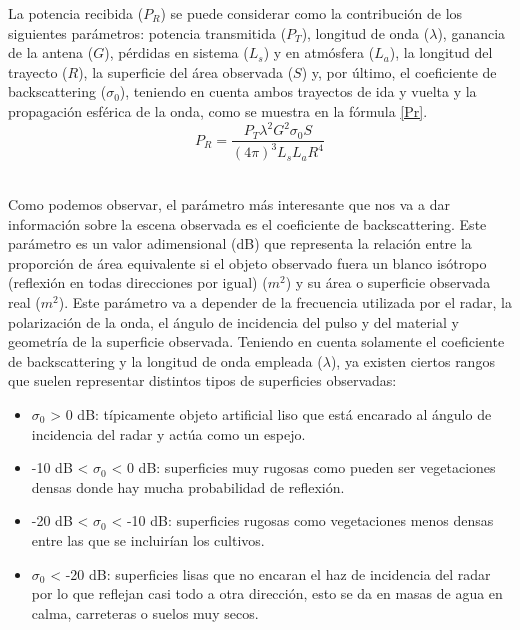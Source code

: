 \par La potencia recibida ($P_{R}$) se puede considerar como la contribución de los siguientes parámetros: potencia transmitida ($P_{T}$), longitud de onda ($\lambda$), ganancia de la antena ($G$), pérdidas en sistema ($L_{s}$) y en atmósfera ($L_{a}$), la longitud del trayecto ($R$), la superficie del área observada ($S$) y, por último, el coeficiente de backscattering ($\sigma_{0}$), teniendo en cuenta ambos trayectos de ida y vuelta y la propagación esférica de la onda, como se muestra en la fórmula \ref{Pr}. 
\\
\begin{equation} \label{Pr}
P_{R}=\frac{P_{T}\lambda ^{2}G^{2}\sigma_{0}S}{(4\pi ) ^{3}L_{s}L_{a}R^{4}}
\end{equation}
\\
\par Como podemos observar, el parámetro más interesante que nos va a dar información sobre la escena observada es el coeficiente de backscattering. Este parámetro es un valor adimensional (dB) que representa la relación entre la proporción de área equivalente si el objeto observado fuera un blanco isótropo (reflexión en todas direcciones por igual) ($m^{2}$) y su área o superficie observada real ($m^{2}$). Este parámetro va a depender de la frecuencia utilizada por el radar, la polarización de la onda, el ángulo de incidencia del pulso y del material y geometría de la superficie observada. Teniendo en cuenta solamente el coeficiente de backscattering y la longitud de onda empleada ($\lambda$), ya existen ciertos rangos que suelen representar distintos tipos de superficies observadas:
\begin{itemize}
	\item $\sigma_{0}$ > 0 dB: típicamente objeto artificial liso que está encarado al ángulo de incidencia del radar y actúa como un espejo.
	\item -10 dB < $\sigma_{0}$ < 0 dB: superficies muy rugosas como pueden ser vegetaciones densas donde hay mucha probabilidad de reflexión.
	\item -20 dB < $\sigma_{0}$ < -10 dB: superficies rugosas como vegetaciones menos densas entre las que se incluirían los cultivos. 
	\item $\sigma_{0}$ < -20 dB: superficies lisas que no encaran el haz de incidencia del radar por lo que reflejan casi todo a otra dirección, esto se da en masas de agua en calma, carreteras o suelos muy secos. 
\end{itemize}

